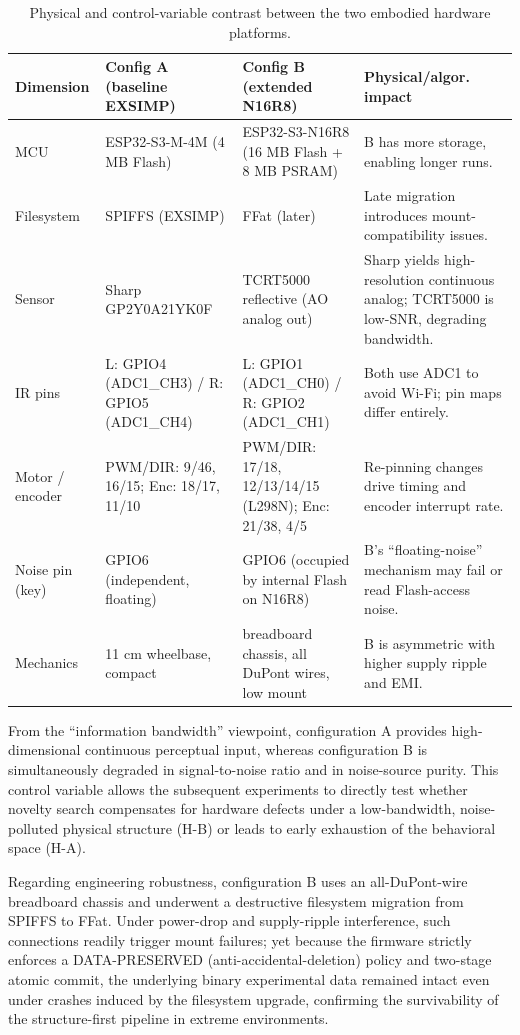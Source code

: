 \documentclass[11pt]{article}
\begin{document}
\begin{table}[!t]
\centering
\small
\caption{Physical and control-variable contrast between the two embodied hardware platforms.}
\label{tab:hw}
\begin{tabular}{@{}p{}p{}p{}p{}@{}}
\toprule
\textbf{Dimension} & \textbf{Config A (baseline EXSIMP)} & \textbf{Config B (extended N16R8)} & \textbf{Physical/algor. impact} \\
\midrule
MCU & ESP32-S3-M-4M (4 MB Flash) & ESP32-S3-N16R8 (16 MB Flash + 8 MB PSRAM) & B has more storage, enabling longer runs. \\
Filesystem & SPIFFS (EXSIMP) & FFat (later) & Late migration introduces mount-compatibility issues. \\
Sensor & Sharp GP2Y0A21YK0F & TCRT5000 reflective (AO analog out) & Sharp yields high-resolution continuous analog; TCRT5000 is low-SNR, degrading bandwidth. \\
IR pins & L: GPIO4 (ADC1\_CH3) / R: GPIO5 (ADC1\_CH4) & L: GPIO1 (ADC1\_CH0) / R: GPIO2 (ADC1\_CH1) & Both use ADC1 to avoid Wi-Fi; pin maps differ entirely. \\
Motor / encoder & PWM/DIR: 9/46, 16/15; Enc: 18/17, 11/10 & PWM/DIR: 17/18, 12/13/14/15 (L298N); Enc: 21/38, 4/5 & Re-pinning changes drive timing and encoder interrupt rate. \\
Noise pin (key) & GPIO6 (independent, floating) & GPIO6 (occupied by internal Flash on N16R8) & B's ``floating-noise'' mechanism may fail or read Flash-access noise. \\
Mechanics & 11 cm wheelbase, compact & breadboard chassis, all DuPont wires, low mount & B is asymmetric with higher supply ripple and EMI. \\
\bottomrule
\end{tabular}
\end{table}

From the ``information bandwidth'' viewpoint, configuration A provides high-dimensional continuous perceptual input, whereas configuration B is simultaneously degraded in signal-to-noise ratio and in noise-source purity. This control variable allows the subsequent experiments to directly test whether novelty search compensates for hardware defects under a low-bandwidth, noise-polluted physical structure (H-B) or leads to early exhaustion of the behavioral space (H-A).

Regarding engineering robustness, configuration B uses an all-DuPont-wire breadboard chassis and underwent a destructive filesystem migration from SPIFFS to FFat. Under power-drop and supply-ripple interference, such connections readily trigger mount failures; yet because the firmware strictly enforces a DATA-PRESERVED (anti-accidental-deletion) policy and two-stage atomic commit, the underlying binary experimental data remained intact even under crashes induced by the filesystem upgrade, confirming the survivability of the structure-first pipeline in extreme environments.
\end{document}

